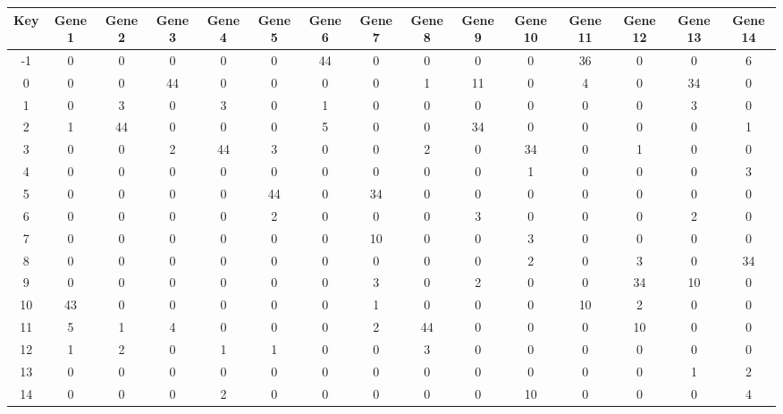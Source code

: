 \begin{tabular}{|c|c|c|c|c|c|c|c|c|c|c|c|c|c|c|}
\hline
Key & Gene 1 & Gene 2 & Gene 3 & Gene 4 & Gene 5 & Gene 6 & Gene 7 & Gene 8 & Gene 9 & Gene 10 & Gene 11 & Gene 12 & Gene 13 & Gene 14 \\
\hline
-1 & 0 & 0 & 0 & 0 & 0 & 44 & 0 & 0 & 0 & 0 & 36 & 0 & 0 & 6 \\
0 & 0 & 0 & 44 & 0 & 0 & 0 & 0 & 1 & 11 & 0 & 4 & 0 & 34 & 0 \\
1 & 0 & 3 & 0 & 3 & 0 & 1 & 0 & 0 & 0 & 0 & 0 & 0 & 3 & 0 \\
2 & 1 & 44 & 0 & 0 & 0 & 5 & 0 & 0 & 34 & 0 & 0 & 0 & 0 & 1 \\
3 & 0 & 0 & 2 & 44 & 3 & 0 & 0 & 2 & 0 & 34 & 0 & 1 & 0 & 0 \\
4 & 0 & 0 & 0 & 0 & 0 & 0 & 0 & 0 & 0 & 1 & 0 & 0 & 0 & 3 \\
5 & 0 & 0 & 0 & 0 & 44 & 0 & 34 & 0 & 0 & 0 & 0 & 0 & 0 & 0 \\
6 & 0 & 0 & 0 & 0 & 2 & 0 & 0 & 0 & 3 & 0 & 0 & 0 & 2 & 0 \\
7 & 0 & 0 & 0 & 0 & 0 & 0 & 10 & 0 & 0 & 3 & 0 & 0 & 0 & 0 \\
8 & 0 & 0 & 0 & 0 & 0 & 0 & 0 & 0 & 0 & 2 & 0 & 3 & 0 & 34 \\
9 & 0 & 0 & 0 & 0 & 0 & 0 & 3 & 0 & 2 & 0 & 0 & 34 & 10 & 0 \\
10 & 43 & 0 & 0 & 0 & 0 & 0 & 1 & 0 & 0 & 0 & 10 & 2 & 0 & 0 \\
11 & 5 & 1 & 4 & 0 & 0 & 0 & 2 & 44 & 0 & 0 & 0 & 10 & 0 & 0 \\
12 & 1 & 2 & 0 & 1 & 1 & 0 & 0 & 3 & 0 & 0 & 0 & 0 & 0 & 0 \\
13 & 0 & 0 & 0 & 0 & 0 & 0 & 0 & 0 & 0 & 0 & 0 & 0 & 1 & 2 \\
14 & 0 & 0 & 0 & 2 & 0 & 0 & 0 & 0 & 0 & 10 & 0 & 0 & 0 & 4 \\
\hline
\end{tabular}